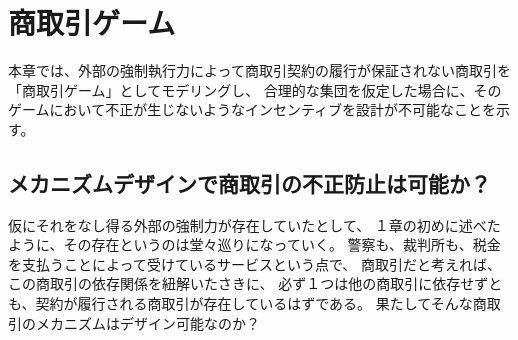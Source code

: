 \chapter{商取引ゲーム}
本章では、外部の強制執行力によって商取引契約の履行が保証されない商取引を「商取引ゲーム」としてモデリングし、
合理的な集団を仮定した場合に、そのゲームにおいて不正が生じないようなインセンティブを設計が不可能なことを示す。







\section{メカニズムデザインで商取引の不正防止は可能か？}
仮にそれをなし得る外部の強制力が存在していたとして、
１章の初めに述べたように、その存在というのは堂々巡りになっていく。
警察も、裁判所も、税金を支払うことによって受けているサービスという点で、
商取引だと考えれば、この商取引の依存関係を紐解いたさきに、
必ず１つは他の商取引に依存せずとも、契約が履行される商取引が存在しているはずである。
果たしてそんな商取引のメカニズムはデザイン可能なのか？

